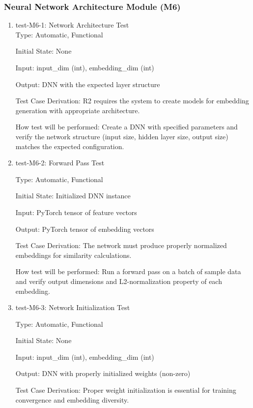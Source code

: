 \documentclass[12pt, titlepage]{article}
\begin{document}
\subsubsection{Neural Network Architecture Module (M6)}

\begin{enumerate}

  \item{test-M6-1: Network Architecture Test\\}
  Type: Automatic, Functional
            
  Initial State: None
            
  Input: input\_dim (int), embedding\_dim (int)
            
  Output: DNN with the expected layer structure
  
  Test Case Derivation: R2 requires the system to create models for embedding generation with appropriate architecture.
  
  How test will be performed: Create a DNN with specified parameters and verify the network structure (input size, hidden layer size, output size) matches the expected configuration.
  
  \item{test-M6-2: Forward Pass Test\\}

  Type: Automatic, Functional
  
  Initial State: Initialized DNN instance
  
  Input: PyTorch tensor of feature vectors
  
  Output: PyTorch tensor of embedding vectors
  
  Test Case Derivation: The network must produce properly normalized embeddings for similarity calculations.
  
  How test will be performed: Run a forward pass on a batch of sample data and verify output dimensions and L2-normalization property of each embedding.
  
  \item{test-M6-3: Network Initialization Test}

  Type: Automatic, Functional
  
  Initial State: None
  
  Input: input\_dim (int), embedding\_dim (int)
  
  Output: DNN with properly initialized weights (non-zero)
  
  Test Case Derivation: Proper weight initialization is essential for training convergence and embedding diversity.
  

\end{enumerate}
\end{document}
